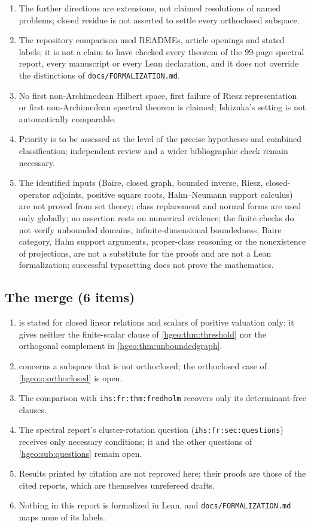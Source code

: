 \documentclass[11pt,letterpaper]{article}
\numberwithin{equation}{section}
\theoremstyle{definition}
\theoremstyle{remark}
\newcommand{\replabel}[1]{\nolinkurl{#1}}
\newcommand{\fn}[1]{\nolinkurl{#1}}
\begin{document}
\begin{enumerate}[leftmargin=*,widest=00,label=06.\arabic*]
\item The further directions are extensions, not claimed resolutions of named
problems; closed residue is not asserted to settle every orthoclosed
subspace.
\item The repository comparison used READMEs, article openings and stated
labels; it is not a claim to have checked every theorem of the 99-page
spectral report, every manuscript or every Lean declaration, and it does not
override the distinctions of \fn{docs/FORMALIZATION.md}.
\item No first non-Archimedean Hilbert space, first failure of Riesz
representation or first non-Archimedean spectral theorem is claimed;
Ishizuka's setting is not automatically comparable.
\item Priority is to be assessed at the level of the precise hypotheses and
combined classification; independent review and a wider bibliographic check
remain necessary.
\item The identified inputs (Baire, closed graph, bounded inverse, Riesz,
closed-operator adjoints, positive square roots, Hahn--Neumann support
calculus) are not proved from set theory; class replacement and normal forms
are used only globally; no assertion rests on numerical evidence; the finite
checks do not verify unbounded domains, infinite-dimensional boundedness,
Baire category, Hahn support arguments, proper-class reasoning or the
nonexistence of projections, are not a substitute for the proofs and are not
a Lean formalization; successful typesetting does not prove the mathematics.
\end{enumerate}

\subsection{The merge (6 items)}
\begin{enumerate}[leftmargin=*,widest=00,label=M.\arabic*]
\item {} is stated for closed linear relations and
scalars of positive valuation only; it gives neither the finite-scalar clause
of \cref{hgeo:thm:threshold} nor the orthogonal complement in
\cref{hgeo:thm:unboundedgraph}.
\item {} concerns a subspace that is not
orthoclosed; the orthoclosed case of \cref{hgeo:q:orthoclosed} is open.
\item The comparison with \replabel{ihs:fr:thm:fredholm} recovers only its
determinant-free clauses.
\item The spectral report's cluster-rotation question
(\replabel{ihs:fr:sec:questions}) receives only necessary conditions; it and
the other questions of \cref{hgeo:sub:questions} remain open.
\item Results printed by citation are not reproved here; their proofs are
those of the cited reports, which are themselves unrefereed drafts.
\item Nothing in this report is formalized in Lean, and
\fn{docs/FORMALIZATION.md} maps none of its labels.
\end{enumerate}
\end{document}

